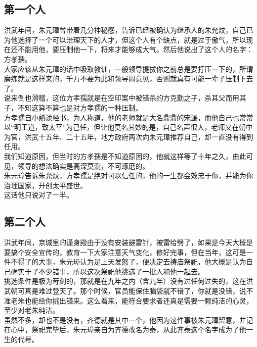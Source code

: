 \begin{multicols}{\theparacolNo}
\subsection{第一个人}
洪武年间，朱元璋曾带着几分神秘感，告诉已经被确认为继承人的朱允炆，自己已为他选择了一个可以治理天下的人才，但这个人有个缺点，就是过于傲气，所以现在还不能用他，要压制他一下，将来才能够成大气。然后他说出了这个人的名字：方孝孺。\\

大家应该从朱元璋的话中吸取教训，一般领导提拔你之前总是要打压一下的，所谓磨练就是这样来的，千万不要为此和领导闹意见，否则就真有可能一辈子压制下去了。\\

说来倒也滑稽，这位方孝孺就是在空印案中被错杀的方克勤之子，杀其父而用其子，不知这算不算也是对方孝孺的一种压制。\\

方孝孺自小熟读经书，为人称道，他的老师就是大名鼎鼎的宋濂，而他自己也常常以“明王道，致太平”为己任，但让他莫名其妙的是，自己名声很大，老师又在朝中为官，洪武十五年、二十五年，地方政府两次向朱元璋推荐自己，却一直没有得到任用。\\

我们知道原因，但当时的方孝孺是不知道原因的，他就这样等了十年之久，由此可见，领导的想法确实是高深莫测，不可琢磨的。\\

朱元璋告诉朱允炆，方孝孺是绝对可以信任的，他的一生都会效忠于你，并能为你治理国家，开创太平盛世。\\

这话他只说对了一半。\\

\subsection{第二个人}
洪武年间，京城里的谨身殿由于没有安装避雷针，被雷给劈了，如果是今天大概是要搞个安全宣传的，教育一下大家注意天气变化，修好完事，但在当年，这可是一件不得了的大事，朱元璋认为是上天发怒了，便决定去祷庙祭祀，他大概是认为自己确实干了不少错事，所以这次祭祀他挑选了一批人和他一起去。\\

挑选条件是极为苛刻的，那就是在九年之内（含九年）没有过任何过失的，这在洪武朝可真是难过登天了。那个时候，官员能保住脑袋就不错了，你就是没错，说不准老朱也能给你挑出错来。这么看来，能符合要求者还真是需要一颗纯洁的心灵，至少对老朱纯洁。\\

虽然不多，却也不是没有，齐德就是其中一个，他因为这件事被朱元璋留意，并记在心中，祭祀完毕后，朱元璋亲自为齐德改名为泰，从此齐泰这个名字成为了他一生的代号。\\


\end{multicols}
